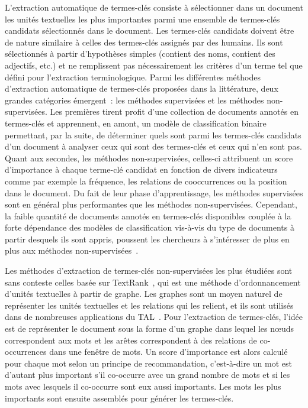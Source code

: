   L'extraction automatique de termes-clés consiste à sélectionner dans un
  document les unités textuelles les plus importantes parmi une ensemble de
  termes-clés candidats sélectionnés dans le document. Les termes-clés candidats
  doivent être de nature similaire à celles des termes-clés assignés par des
  humains. Ils sont sélectionnés à partir d'hypothèses simples (contient des
  noms, contient des adjectifs, etc.) et ne remplissent pas nécessairement les
  critères d'un terme tel que défini pour l'extraction terminologique. Parmi les
  différentes méthodes d'extraction automatique de termes-clés proposées dans la
  littérature, deux grandes catégories émergent~: les méthodes supervisées et
  les méthodes non-supervisées. Les premières tirent profit d'une collection de
  documents annotés en termes-clés et apprennent, en amont, un modèle de
  classification binaire permettant, par la suite, de déterminer quels sont
  parmi les termes-clés candidats d'un document à analyser ceux qui sont des
  termes-clés et ceux qui n'en sont pas. Quant aux secondes, les méthodes
  non-supervisées, celles-ci attribuent un score d'importance à chaque terme-clé
  candidat en fonction de divers indicateurs comme par exemple la fréquence, les
  relations de cooccurrences ou la position dans le document. Du fait de leur
  phase d'apprentissage, les méthodes supervisées sont en général plus
  performantes que les méthodes non-supervisées. Cependant, la faible quantité
  de documents annotés en termes-clés disponibles couplée à la forte dépendance
  des modèles de classification vis-à-vis du type de documents à partir desquels
  ils sont appris, poussent les chercheurs à s'intéresser de plus en plus aux
  méthodes non-supervisées~\cite{hassan2010conundrums}.

  Les méthodes d'extraction de termes-clés non-supervisées les plus étudiées
  sont sans conteste celles basée sur TextRank~\cite{mihalcea2004textrank}, qui
  est une méthode d'ordonnancement d'unités textuelles à partir de graphe. Les
  graphes sont un moyen naturel de représenter les unités textuelles et les
  relations qui les relient, et ils sont utilisés dans de nombreuses
  applications du TAL~\cite{kozareva2013textgraphs}. Pour l'extraction de
  termes-clés, l'idée est de représenter le document sous la forme d'un graphe
  dans lequel les n\oe{}uds correspondent aux mots et les arêtes correspondent à
  des relations de co-occurrences dans une fenêtre de mots. Un score
  d'importance est alors calculé pour chaque mot selon un principe de
  recommandation, c'est-à-dire un mot est d'autant plus important s'il
  co-occurre avec un grand nombre de mots et si les mots avec lesquels il
  co-occurre sont eux aussi importants. Les mots les plus importants sont
  ensuite assemblés pour générer les termes-clés.

